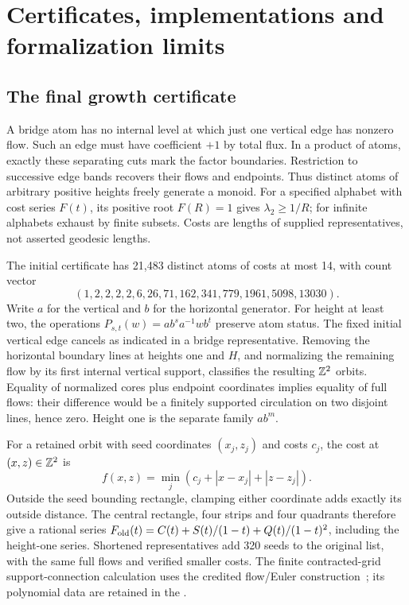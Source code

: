 \section{Certificates, implementations and formalization limits}\label{app:certificates}

\subsection{The final growth certificate}\label{app:g9-certificate}
A bridge atom has no internal level at which just one vertical edge
has nonzero flow. Such an edge must have coefficient $+1$ by total
flux. In a product of atoms, exactly these separating cuts mark the
factor boundaries. Restriction to successive edge bands recovers
their flows and endpoints. Thus distinct atoms of arbitrary positive
heights freely generate a monoid. For a specified alphabet with
cost series $F(t)$, its positive root $F(R)=1$ gives
$\lambda_2\ge1/R$; for infinite alphabets exhaust by finite subsets.
Costs are lengths of supplied representatives, not asserted geodesic
lengths.

The initial certificate has 21,483 distinct atoms of costs at most
14, with count vector
\[
 (1,2,2,2,2,6,26,71,162,341,779,1961,5098,13030).
\]
Write $a$ for the vertical and $b$ for the horizontal generator.
For height at least two, the operations
$P_{s,t}(w)=ab^sa^{-1}wb^t$ preserve atom status. The fixed initial
vertical edge cancels as indicated in a bridge representative. Removing
the horizontal boundary lines at heights one and $H$, and normalizing
the remaining flow by its first internal vertical support, classifies
the resulting $\mathbb Z^2$ orbits. Equality of normalized cores plus endpoint
coordinates implies equality of full flows: their difference would be
a finitely supported circulation on two disjoint lines, hence zero.
Height one is the separate family $ab^m$.

For a retained orbit with seed coordinates $(x_j,z_j)$ and costs $c_j$,
the cost at $(x,z)\in\mathbb Z^2$ is
\[
 f(x,z)=\min_j(c_j+|x-x_j|+|z-z_j|).
\]
Outside the seed bounding rectangle, clamping either coordinate adds
exactly its outside distance. The central rectangle, four strips and
four quadrants therefore give a rational series
$F_{\rm old}(t)=C(t)+S(t)/(1-t)+Q(t)/(1-t)^2$, including the
height-one series. Shortened representatives add 320 seeds to the
original list, with the same full flows and verified smaller costs.
The finite contracted-grid support-connection calculation uses the
credited flow/Euler construction~\cite{mruv}; its polynomial data are
retained in the
.

